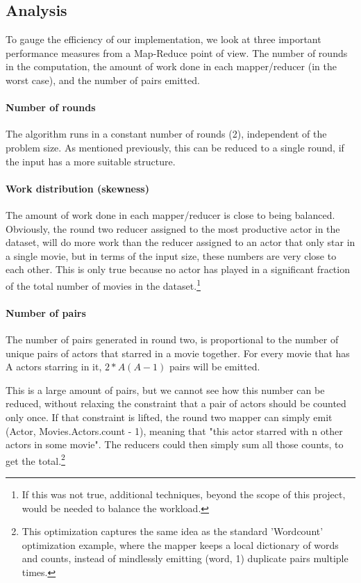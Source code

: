 \documentclass[a4paper,11pt]{article}
\begin{document}
\subsection{Analysis}
To gauge the efficiency of our implementation, we look at three important performance measures from a Map-Reduce point of view. The number of rounds in the computation, the amount of work done in each mapper/reducer (in the worst case), and the number of pairs emitted.

\paragraph{Number of rounds}
The algorithm runs in a constant number of rounds (2), independent of the problem size. As mentioned previously, this can be reduced to a single round, if the input has a more suitable structure.

\paragraph{Work distribution (skewness)}
The amount of work done in each mapper/reducer is close to being balanced. Obviously, the round two reducer assigned to the most productive actor in the dataset, will do more work than the reducer assigned to an actor that only star in a single movie, but in terms of the input size, these numbers are very close to each other. This is only true because no actor has played in a significant fraction of the total number of movies in the dataset.\footnote{If this was not true, additional techniques, beyond the scope of this project, would be needed to balance the workload.}

\paragraph{Number of pairs}
The number of pairs generated in round two, is proportional to the number of unique pairs of actors that starred in a movie together. For every movie that has A actors starring in it, $2*A(A-1)$ pairs will be emitted. %

This is a large amount of pairs, but we cannot see how this number can be reduced, without relaxing the constraint that a pair of actors should be counted only once. If that constraint is lifted, the round two mapper can simply emit (Actor, Movies.Actors.count - 1), meaning that "this actor starred with n other actors in some movie". The reducers could then simply sum all those counts, to get the total.\footnote{This optimization captures the same idea as the standard 'Wordcount' optimization example, where the mapper keeps a local dictionary of words and counts, instead of mindlessly emitting (word, 1) duplicate pairs multiple times.}\\
\end{document}
